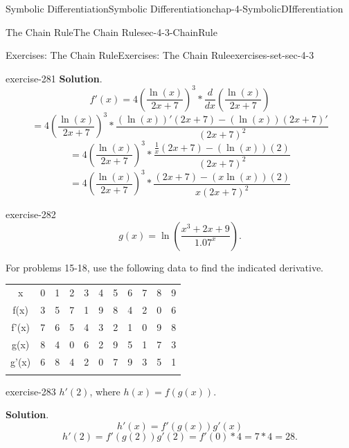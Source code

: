 \documentclass[oneside,10pt,]{book}
\numberwithin{equation}{section}
\newcommand{\hrulethin}  {\noalign{\hrule height 0.04em}}
\newcommand{\hrulethick} {\noalign{\hrule height 0.11em}}
\begin{document}
\begin{chapterptx}{Symbolic Differentiation}{}{Symbolic Differentiation}{}{}{chap-4-SymbolicDIfferentiation}
\begin{sectionptx}{The Chain Rule}{}{The Chain Rule}{}{}{sec-4-3-ChainRule}
\begin{exercises-subsection-numberless}{Exercises: The Chain Rule}{}{Exercises: The Chain Rule}{}{}{exercises-set-sec-4-3}
\begin{divisionexercise}{13}{}{}{exercise-281}
\noindent\textbf{Solution}.\hypertarget{solution-140}{}\quad%
%
\begin{equation*}
f'(x)=4\left(\frac{\ln(x)}{2x+7}\right)^3*\frac{d}{dx} \left(\frac{\ln(x)}{2x+7}\right) 
\end{equation*}
%
\begin{equation*}
=4\left(\frac{\ln(x)}{2x+7}\right)^3*
\frac{(\ln(x) )' (2x+7)-(\ln(x) ) (2x+7)'}{(2x+7)^2} 
\end{equation*}
%
\begin{equation*}
=4\left(\frac{\ln(x)}{2x+7}\right)^3*
\frac{\frac{1}{x} (2x+7)-(\ln(x) )(2)}{(2x+7)^2} 
\end{equation*}
%
\begin{equation*}
=4\left(\frac{\ln(x)}{2x+7}\right)^3*
\frac{ (2x+7)-(x\ln(x) )(2)}{x(2x+7)^2}
\end{equation*}
\end{divisionexercise}%
\begin{divisionexercise}{14}{}{}{exercise-282}%
\hypertarget{p-1678}{}%
%
\begin{equation*}
g(x)=\ln\left(\frac{x^3+2x+9}{1.07^x} \right)\text{.}
\end{equation*}
%
\end{divisionexercise}%
\hypertarget{p-1679}{}%
For problems 15-18, use the following data to find the indicated derivative.%
\begin{sidebyside}{1}{0}{0}{0}%
\begin{sbspanel}{1}%
{\centering%
\begin{tabular}{ccccccccccc}\hrulethick
x&0&1&2&3&4&5&6&7&8&9\tabularnewline\hrulethin
f(x)&3&5&7&1&9&8&4&2&0&6\tabularnewline\hrulethin
f'(x)&7&6&5&4&3&2&1&0&9&8\tabularnewline\hrulethin
g(x)&8&4&0&6&2&9&5&1&7&3\tabularnewline\hrulethin
g'(x)&6&8&4&2&0&7&9&3&5&1\tabularnewline\hrulethin
\end{tabular}
\par}
\end{sbspanel}%
\end{sidebyside}%
\begin{divisionexercise}{15}{}{}{exercise-283}%
\hypertarget{p-1680}{}%
\(h'(2)\), where \(h(x)=f(g(x))\).%
\par\smallskip%
\noindent\textbf{Solution}.\hypertarget{solution-141}{}\quad%
%
\begin{equation*}
h'(x)=f'(g(x)) g'(x)
\end{equation*}
%
\begin{equation*}
h'(2)=f'(g(2))  g' (2)
=f' (0)*4
=7*4=28.
\end{equation*}

\end{divisionexercise}
\end{exercises-subsection-numberless}
\end{sectionptx}
\end{chapterptx}
\end{document}
